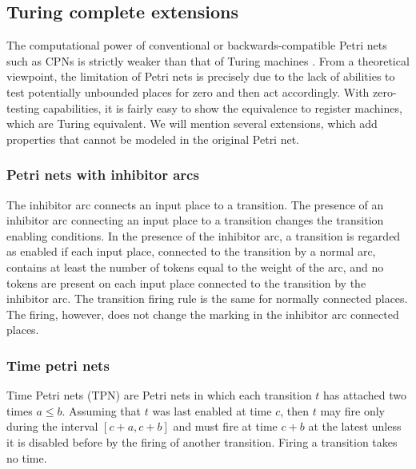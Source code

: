 

\subsection{Turing complete extensions} %
\label{sub:turing_complete_extensions}

The computational power of conventional or backwards-compatible Petri nets such as CPNs is strictly weaker than that of Turing machines \cite{Yen06PetriNets}. From a theoretical viewpoint, the limitation of Petri nets is precisely due to the lack of abilities to test potentially unbounded places for zero and then act accordingly. With zero-testing capabilities, it is fairly easy to show the equivalence to register machines, which are Turing equivalent. We will mention several extensions, which add properties that cannot be modeled in the original Petri net.

\subsubsection{Petri nets with inhibitor arcs} %
\label{ssub:petri_nets_with_inhibitor_arcs}

The  inhibitor arc connects an input place to a transition. The presence of an inhibitor arc connecting an input place to a transition changes the transition enabling conditions. In the presence of the inhibitor arc, a transition is regarded as enabled if each input place, connected to the transition by a normal arc, contains at least the number of tokens equal to the weight of the arc, and no tokens are present on each input place connected to the transition by the
inhibitor arc. The transition firing rule is the same for normally connected places. The firing, however, does not change the marking in the inhibitor arc connected places. 


\subsubsection{Time petri nets} %
\label{ssub:time_petri_nets}

 Time Petri nets (TPN) are Petri nets in which each transition $t$ has attached two times $a\leq b$. Assuming that $t$ was last enabled at time $c$, then $t$ may fire only during the interval $[c+a, c+b]$ and must fire at time $c+b$ at the latest unless it is disabled before by the firing of another transition. Firing a transition takes no time.


